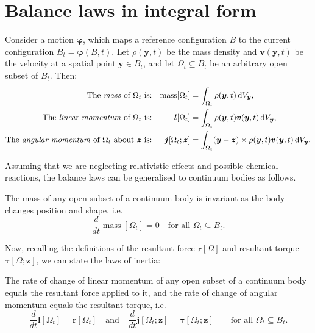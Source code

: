 \documentclass[
  letterpaper,
  DIV=11,
  numbers=noendperiod]{scrreprt}
\theoremstyle{plain}
\theoremstyle{remark}
\begin{document}
\section{Balance laws in integral
form}\label{balance-laws-in-integral-form}

Consider a motion \({\boldsymbol{\varphi}}\), which maps a reference
configuration \(B\) to the current configuration
\(B_t={\boldsymbol{\varphi}}(B,t)\). Let \(\rho({\boldsymbol{y}},t)\) be
the mass density and \({\boldsymbol{v}}({\boldsymbol{y}},t)\) be the
velocity at a spatial point \({\boldsymbol{y}}\in B_t\), and let
\(\Omega_t\subseteq B_t\) be an arbitrary open subset of \(B_t\). Then:
\[\begin{aligned}
    \text{The \emph{mass} of $\Omega_t$ is:}&&{\operatorname{mass}}[\Omega_t] &= \int_{\Omega_t}\rho({\boldsymbol{y}},t){\,{\mathrm{d}}V_{{\boldsymbol{y}}}},\\
    \text{The \emph{linear momentum} of $\Omega_t$ is:}&&{\boldsymbol{l}}[\Omega_t] &= \int_{\Omega_t}\rho({\boldsymbol{y}},t){\boldsymbol{v}}({\boldsymbol{y}},t){\,{\mathrm{d}}V_{{\boldsymbol{y}}}},\\
    \text{The \emph{angular momentum} of $\Omega_t$ about ${\boldsymbol{z}}$ is:}&&{\boldsymbol{j}}[\Omega_t;{\boldsymbol{z}}] &= \int_{\Omega_t}({\boldsymbol{y}}-{\boldsymbol{z}})\times \rho({\boldsymbol{y}},t){\boldsymbol{v}}({\boldsymbol{y}},t){\,{\mathrm{d}}V_{{\boldsymbol{y}}}}.
  \end{aligned}\]

Assuming that we are neglecting relativistic effects and possible
chemical reactions, the balance laws can be generalised to continuum
bodies as follows.

\label{ax:ConservationOfMass}{}
\label{ax:massconservation}{} The mass of any open subset
of a continuum body is invariant as the body changes position and shape,
i.e.
\[\frac{d}{dt}{\operatorname{mass}}[\Omega_t] = 0\quad\text{for all }\Omega_t\subseteq B_t.\]

Now, recalling the definitions of the resultant force
\({\boldsymbol{r}}[\Omega]\) and resultant torque
\({\boldsymbol{\tau}}[\Omega;{\boldsymbol{z}}]\), we can state the laws
of inertia:

\label{ax:LawsOfInertia}{}
\label{ax:lawsofinertia}{} The rate of change of linear
momentum of any open subset of a continuum body equals the resultant
force applied to it, and the rate of change of angular momentum equals
the resultant torque, i.e.
\[\frac{d}{dt}{\boldsymbol{l}}[\Omega_t] = {\boldsymbol{r}}[\Omega_t]\quad\text{and}\quad \frac{d}{dt}{\boldsymbol{j}}[\Omega_t;{\boldsymbol{z}}]={\boldsymbol{\tau}}[\Omega_t;{\boldsymbol{z}}]\qquad\text{for all }\Omega_t\subseteq B_t.\]
\end{document}
